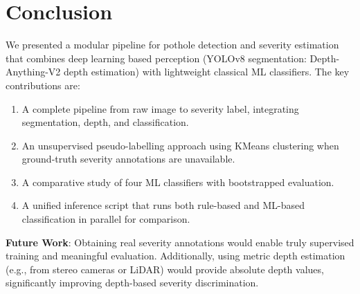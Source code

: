\documentclass[12pt, a4paper]{article}
\begin{document}
\section{Conclusion}
\label{sec:conclusion}

We presented a modular pipeline for pothole detection and severity estimation that combines deep learning based perception (YOLOv8 segmentation: Depth-Anything-V2 depth estimation) with lightweight classical ML classifiers. The key contributions are:

\begin{enumerate}
    \item A complete pipeline from raw image to severity label, integrating segmentation, depth, and classification.
    \item An unsupervised pseudo-labelling approach using KMeans clustering when ground-truth severity annotations are unavailable.
    \item A comparative study of four ML classifiers with bootstrapped evaluation.
    \item A unified inference script that runs both rule-based and ML-based classification in parallel for comparison.
\end{enumerate}

\textbf{Future Work}: Obtaining real severity annotations would enable truly supervised training and meaningful evaluation. Additionally, using metric depth estimation (e.g., from stereo cameras or LiDAR) would provide absolute depth values, significantly improving depth-based severity discrimination.
\end{document}
